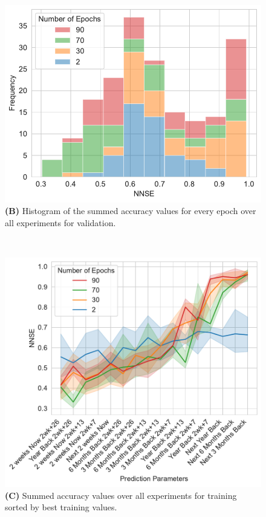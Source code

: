 \documentclass[utf8]{FrontiersinVancouver} %
\begin{document}
\begin{figure}[p]
{\begin{center}
  \ \
     \begin{minipage}[t]{0.49\textwidth}
        \includegraphics[width=1.0\linewidth]{images/frequency_nnse_histogram_stacked_df_validation_summed}
        {\bf (B)} Histogram of the summed accuracy values for every epoch over all experiments for validation.
     \end{minipage}
  \ \
     \begin{minipage}[t]{0.49\textwidth}
        \includegraphics[width=1.0\linewidth]{images/NNSE-all-epochs-training-summed}
        {\bf (C)} Summed accuracy values over all experiments for training sorted by best training values.

\end{minipage}
\end{center}}
\end{figure}
\end{document}
